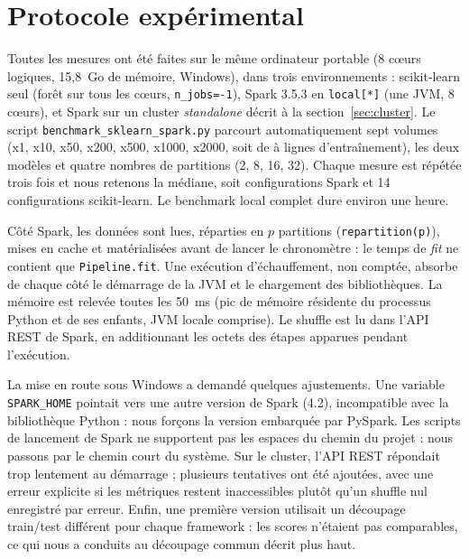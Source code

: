 \documentclass[11pt,a4paper]{article}
\newcommand{\code}[1]{\texttt{#1}}
\newcommand{\lin}{x}
\begin{document}
\section{Protocole expérimental}

Toutes les mesures ont été faites sur le même ordinateur portable (8 cœurs logiques, 15,8~Go de
mémoire, Windows), dans trois environnements : scikit-learn seul (forêt sur tous les cœurs,
\code{n\_jobs=-1}), Spark 3.5.3 en \code{local[*]} (une JVM, 8 cœurs), et Spark sur un cluster
\emph{standalone} décrit à la section~\ref{sec:cluster}. Le script \code{benchmark\_sklearn\_spark.py}
parcourt automatiquement sept volumes (\lin1, \lin10, \lin50, \lin200, \lin500, \lin1000, \lin2000,
soit de \nUnTrain{} à \nMaxTrain{} lignes d'entraînement), les deux modèles et quatre nombres de
partitions (2, 8, 16, 32). Chaque mesure est répétée trois fois et nous retenons la médiane, soit
\nRunsSpark{} configurations Spark et 14 configurations scikit-learn. Le benchmark local complet dure
environ une heure.

Côté Spark, les données sont lues, réparties en $p$ partitions (\code{repartition(p)}), mises en cache
et matérialisées avant de lancer le chronomètre : le temps de \emph{fit} ne contient que
\code{Pipeline.fit}. Une exécution d'échauffement, non comptée, absorbe de chaque côté le démarrage de
la JVM et le chargement des bibliothèques. La mémoire est relevée toutes les 50~ms (pic de mémoire
résidente du processus Python et de ses enfants, JVM locale comprise). Le shuffle est lu dans l'API
REST de Spark, en additionnant les octets des étapes apparues pendant l'exécution.

La mise en route sous Windows a demandé quelques ajustements. Une variable \code{SPARK\_HOME} pointait
vers une autre version de Spark (4.2), incompatible avec la bibliothèque Python : nous forçons la
version embarquée par PySpark. Les scripts de lancement de Spark ne supportent pas les espaces du
chemin du projet : nous passons par le chemin court du système. Sur le cluster, l'API REST répondait
trop lentement au démarrage ; plusieurs tentatives ont été ajoutées, avec une erreur explicite si les
métriques restent inaccessibles plutôt qu'un shuffle nul enregistré par erreur. Enfin, une première
version utilisait un découpage train/test différent pour chaque framework : les scores n'étaient pas
comparables, ce qui nous a conduits au découpage commun décrit plus haut.

\end{document}

